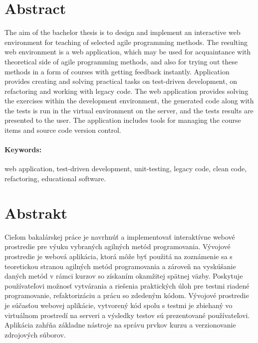 \documentclass[12pt, oneside]{book}  %
\begin{document}
\newpage 
\section*{Abstract}

The aim of the bachelor thesis is to design and implement an interactive web environment for teaching of selected agile programming methods. The resulting web environment is a web application, which may be used for acquaintance with theoretical side of agile programming methods, and also for trying out these methods in a form of courses with getting feedback instantly. Application provides creating and solving practical tasks on test-driven development, on refactoring and working with legacy code. The web application provides solving the exercises within the development environment, the generated code along with the tests is run in the virtual environment on the server, and the tests results are presented to the user. The application includes tools for managing the course items and source code version control.


\paragraph*{Keywords:} web application, test-driven development, unit-testing, legacy code, clean code, refactoring, educational software.




\newpage 
\section*{Abstrakt}


Cieľom bakalárskej práce je navrhnúť a implementovať interaktívne webové prostredie pre výuku vybraných agilných metód programovania. Vývojové prostredie je webová aplikácia, ktorá môže byť použitá na zoznámenie sa s teoretickou stranou agilných metód programovania a zároveň na vyskúšanie daných metód v rámci kurzov so získaním okamžitej spätnej väzby. Poskytuje používateľovi možnosť vytvárania a riešenia praktických úloh pre testmi riadené programovanie, refaktorizáciu a prácu so zdedeným kódom. Vývojové prostredie je súčasťou webovej aplikácie, vytvorený kód spolu s testmi je zbiehaný vo virtuálnom prostredí na serveri a výsledky testov sú prezentované používateľovi. Aplikácia zahŕňa základne nástroje na správu prvkov kurzu a verzionovanie zdrojových súborov.
\end{document}
